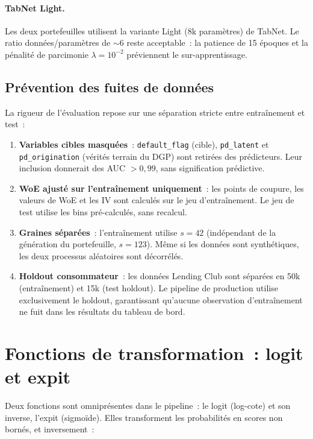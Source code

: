 \documentclass[12pt, a4paper, twoside, openright]{report}
\theoremstyle{definition}
\begin{document}
\paragraph{TabNet Light.} Les deux portefeuilles utilisent la variante Light (8k paramètres) de TabNet. Le ratio données/paramètres de $\sim$6 reste acceptable~: la patience de 15 époques et la pénalité de parcimonie $\lambda = 10^{-2}$ préviennent le sur-apprentissage.

\subsection{Prévention des fuites de données}

La rigueur de l'évaluation repose sur une séparation stricte entre entraînement et test~:

\begin{enumerate}[nosep]
  \item \textbf{Variables cibles masquées}~: \texttt{default\_flag} (cible), \texttt{pd\_latent} et \texttt{pd\_origination} (vérités terrain du DGP) sont retirées des prédicteurs. Leur inclusion donnerait des AUC $> 0{,}99$, sans signification prédictive.
  \item \textbf{WoE ajusté sur l'entraînement uniquement}~: les points de coupure, les valeurs de WoE et les IV sont calculés sur le jeu d'entraînement. Le jeu de test utilise les bins pré-calculés, sans recalcul.
  \item \textbf{Graines séparées}~: l'entraînement utilise $s = 42$ (indépendant de la génération du portefeuille, $s = 123$). Même si les données sont synthétiques, les deux processus aléatoires sont décorrélés.
  \item \textbf{Holdout consommateur}~: les données Lending Club sont séparées en 50k (entraînement) et 15k (test holdout). Le pipeline de production utilise exclusivement le holdout, garantissant qu'aucune observation d'entraînement ne fuit dans les résultats du tableau de bord.
\end{enumerate}

\section{Fonctions de transformation~: logit et expit}
\label{sec:pd:logit-expit}

Deux fonctions sont omniprésentes dans le pipeline~: le logit (log-cote) et son inverse, l'expit (sigmoïde). Elles transforment les probabilités en scores non bornés, et inversement~:
\end{document}
